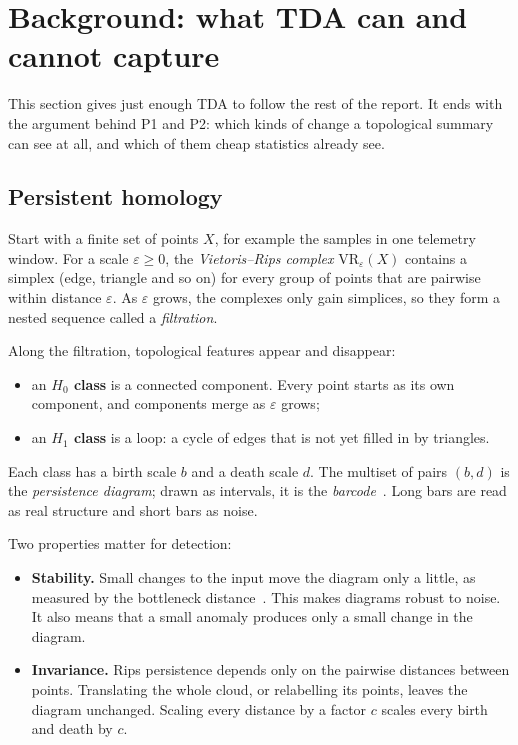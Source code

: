 \section{Background: what TDA can and cannot capture}
\label{sec:background}

This section gives just enough TDA to follow the rest of the report. It ends with the argument behind P1 and P2: which kinds of change a topological summary can see at all, and which of them cheap statistics already see.

\subsection{Persistent homology}
Start with a finite set of points $X$, for example the samples in one telemetry window. For a scale $\varepsilon \ge 0$, the \emph{Vietoris--Rips complex} $\mathrm{VR}_\varepsilon(X)$ contains a simplex (edge, triangle and so on) for every group of points that are pairwise within distance $\varepsilon$. As $\varepsilon$ grows, the complexes only gain simplices, so they form a nested sequence called a \emph{filtration}.

Along the filtration, topological features appear and disappear:
\begin{itemize}
  \item an \textbf{$H_0$ class} is a connected component. Every point starts as its own component, and components merge as $\varepsilon$ grows;
  \item an \textbf{$H_1$ class} is a loop: a cycle of edges that is not yet filled in by triangles.
\end{itemize}
Each class has a birth scale $b$ and a death scale $d$. The multiset of pairs $(b,d)$ is the \emph{persistence diagram}; drawn as intervals, it is the \emph{barcode}~\cite{edelsbrunner2002persistence,A01}. Long bars are read as real structure and short bars as noise.

Two properties matter for detection:
\begin{itemize}
  \item \textbf{Stability.} Small changes to the input move the diagram only a little, as measured by the bottleneck distance~\cite{A02}. This makes diagrams robust to noise. It also means that a small anomaly produces only a small change in the diagram.
  \item \textbf{Invariance.} Rips persistence depends only on the pairwise distances between points. Translating the whole cloud, or relabelling its points, leaves the diagram unchanged. Scaling every distance by a factor $c$ scales every birth and death by $c$.
\end{itemize}

